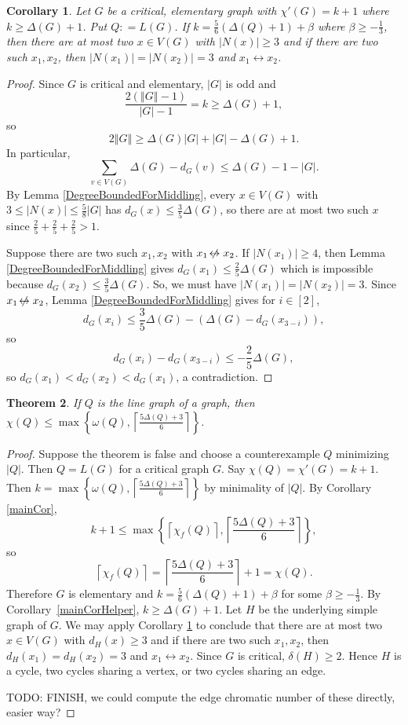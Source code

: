 \documentclass[12pt]{amsart}
\theoremstyle{plain}
\newtheorem{thm}{Theorem}
\newtheorem{cor}[thm]{Corollary}
\theoremstyle{definition}
\theoremstyle{remark}
\newcommand{\set}[1]{\left\{ #1 \right\}}
\newcommand{\card}[1]{\left|#1\right|}
\newcommand{\size}[1]{\left\Vert#1\right\Vert}
\newcommand{\ceil}[1]{\left\lceil#1\right\rceil}
\newcommand{\irange}[1]{\left[#1\right]}
\newcommand{\parens}[1]{\left( #1 \right)}
\newcommand{\DefinedAs}{\mathrel{\mathop:}=}
\def\adj{\leftrightarrow}
\def\nonadj{\not\!\leftrightarrow}
\begin{document}
\begin{cor}\label{CriticalElementary56}
Let $G$ be a critical, elementary graph with $\chi'(G) = k + 1$ where $k \ge \Delta(G) + 1$.  Put $Q \DefinedAs L(G)$. 
If $k = \frac56\parens{\Delta(Q) + 1} + \beta$ where $\beta \ge -\frac13$, then there are at most two $x \in V(G)$ with $\card{N(x)} \ge 3$
and if there are two such $x_1, x_2$, then $\card{N(x_1)} = \card{N(x_2)} = 3$ and $x_1 \adj x_2$.
\end{cor}
\begin{proof}
Since $G$ is critical and elementary, $\card{G}$ is odd and
\[\frac{2(\size{G} - 1)}{\card{G} - 1} = k \ge \Delta(G) + 1,\]
so
\[2\size{G} \ge \Delta(G)\card{G} + \card{G} - \Delta(G) + 1.\]
In particular,
\[\sum_{v \in V(G)} \Delta(G) - d_G(v) \le \Delta(G) - 1 - \card{G}.\]
By Lemma \ref{DegreeBoundedForMiddling}, every $x \in V(G)$ with $3 \le \card{N(x)} \le \frac58\card{G}$ has $d_G(x) \le \frac35\Delta(G)$, so there are at most two such $x$ since
$\frac25 + \frac25 + \frac25 > 1$.

Suppose there are two such $x_1, x_2$ with $x_1 \nonadj x_2$.  If $\card{N(x_1)} \ge 4$, then Lemma \ref{DegreeBoundedForMiddling} gives $d_G(x_1) \le \frac25\Delta(G)$ which is impossible because $d_G(x_2) \le \frac35\Delta(G)$.  So, we must have $\card{N(x_1)} = \card{N(x_2)} = 3$.  Since $x_1 \nonadj x_2$, Lemma \ref{DegreeBoundedForMiddling} gives for $i \in \irange{2}$,
\[d_G(x_i) \le \frac35\Delta(G) - (\Delta(G) - d_G(x_{3-i})),\]
so
\[d_G(x_i) - d_G(x_{3-i}) \le -\frac25\Delta(G),\]
so $d_G(x_1) < d_G(x_2) < d_G(x_1)$, a contradiction.
\end{proof}

\begin{thm}
If $Q$ is the line graph of a
graph, then $\chi(Q)\le \max\set{\omega(Q),\ceil{\frac{5\Delta(Q)+3}{6}}}$.
\end{thm}
\begin{proof}
Suppose the theorem is false and choose a counterexample $Q$ minimizing $\card{Q}$.  Then $Q = L(G)$ for a critical graph $G$.  Say $\chi(Q) = \chi'(G) = k + 1$.  Then
$k = \max\set{\omega(Q),\ceil{\frac{5\Delta(Q)+3}{6}}}$ by minimality of $\card{Q}$.  By Corollary \ref{mainCor},
\[k+1 \le \max\set{\ceil{\chi_f(Q)}, \ceil{\frac{5\Delta(Q)+3}{6}}},\]
so
\[\ceil{\chi_f(Q)} = \ceil{\frac{5\Delta(Q)+3}{6}} + 1 = \chi(Q).\]
Therefore $G$ is elementary and $k = \frac56\parens{\Delta(Q) + 1} + \beta$ for some $\beta \ge -\frac13$.  By Corollary~\ref{mainCorHelper}, $k \ge \Delta(G) + 1$.
Let $H$ be the underlying simple graph of $G$.
We may apply Corollary \ref{CriticalElementary56} to conclude that there are at most two $x \in V(G)$ with $d_H(x) \ge 3$
and if there are two such $x_1, x_2$, then $d_H(x_1) = d_H(x_2) = 3$ and $x_1 \adj x_2$.  
Since $G$ is critical, $\delta(H) \ge 2$.  Hence $H$ is a cycle, two cycles sharing a vertex, or two cycles sharing an edge.

TODO: FINISH, we could compute the edge chromatic number of these directly, easier way?


\end{proof}
\end{document}

